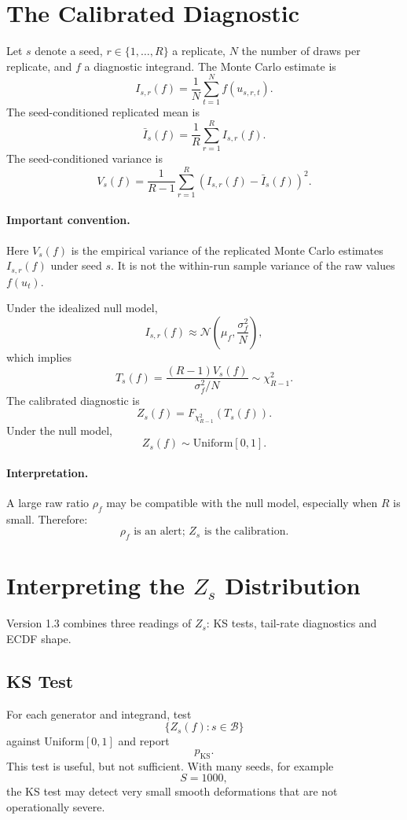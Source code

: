 \documentclass[11pt,a4paper]{article}
\newcommand{\Unif}{\mathrm{Uniform}}
\newcommand{\KS}{\mathrm{KS}}
\begin{document}
\section{The Calibrated Diagnostic}

Let $s$ denote a seed, $r\in\{1,\ldots,R\}$ a replicate, $N$ the number of draws per replicate, and $f$ a diagnostic integrand. The Monte Carlo estimate is
\[
I_{s,r}(f)
=
\frac1N
\sum_{t=1}^{N}
f(u_{s,r,t}).
\]
The seed-conditioned replicated mean is
\[
\bar I_s(f)
=
\frac1R
\sum_{r=1}^{R}
I_{s,r}(f).
\]
The seed-conditioned variance is
\[
V_s(f)
=
\frac1{R-1}
\sum_{r=1}^{R}
\left(
I_{s,r}(f)-\bar I_s(f)
\right)^2.
\]

\paragraph{Important convention.}
Here $V_s(f)$ is the empirical variance of the replicated Monte Carlo estimates $I_{s,r}(f)$ under seed $s$. It is not the within-run sample variance of the raw values $f(u_t)$.

Under the idealized null model,
\[
I_{s,r}(f)
\approx
\mathcal N
\left(
\mu_f,\frac{\sigma_f^2}{N}
\right),
\]
which implies
\[
T_s(f)
=
\frac{(R-1)V_s(f)}
{\sigma_f^2/N}
\sim
\chi^2_{R-1}.
\]
The calibrated diagnostic is
\[
\boxed{
Z_s(f)
=
F_{\chi^2_{R-1}}
\left(
T_s(f)
\right).
}
\]
Under the null model,
\[
\boxed{
Z_s(f)\sim \Unif[0,1].
}
\]

\paragraph{Interpretation.}
A large raw ratio $\rho_f$ may be compatible with the null model, especially when $R$ is small. Therefore:
\[
\boxed{
\rho_f\text{ is an alert; } Z_s\text{ is the calibration.}
}
\]

\section{Interpreting the $Z_s$ Distribution}

Version 1.3 combines three readings of $Z_s$: KS tests, tail-rate diagnostics and ECDF shape.

\subsection{KS Test}

For each generator and integrand, test
\[
\{Z_s(f):s\in\mathcal B\}
\]
against $\Unif[0,1]$ and report
\[
p_{\KS}.
\]
This test is useful, but not sufficient. With many seeds, for example
\[
S=1000,
\]
the KS test may detect very small smooth deformations that are not operationally severe.
\end{document}
